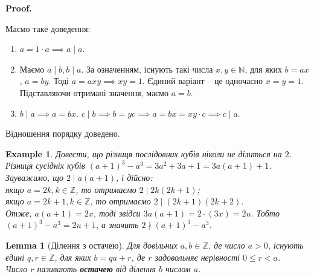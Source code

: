 \documentclass[a4paper, 14pt]{extarticle}
\makeatletter
\theoremstyle{theoremdd}
\theoremstyle{theoremdd}
\theoremstyle{theoremdd}
\theoremstyle{theoremdd}
\newtheorem{example}[theorem]{Example}
\theoremstyle{theoremdd}
\theoremstyle{theoremdd}
\theoremstyle{theoremdd}
\newtheorem{lemma}[theorem]{Lemma}
\theoremstyle{theoremdd}
\def\qed{$\blacksquare$}
\renewenvironment{proof}[1][Proof.\\]{\par
\pushQED{\hfill \qed}%
\normalfont \topsep6\p@\@plus6\p@\relax
\trivlist
\item\relax
{\bfseries
#1\@addpunct{.}}\hspace\labelsep\ignorespaces
}{%
\popQED\endtrivlist\@endpefalse
}
\makeatother
\begin{document}
\begin{proof}
Маємо таке доведення:
\begin{enumerate}[wide=0pt,label={\arabic*)}]
\item $a = 1 \cdot a \implies a \mid a$.
\item Маємо $a \mid b, b \mid a$. За означенням, існують такі числа $x,y \in \mathbb{N}$, для яких $b = ax$, $a = by$. Тоді $a = axy \implies xy = 1$. Єдиний варіант -- це одночасно $x = y = 1$. Підставляючи отримані значення, маємо $a = b$.
\item $b \mid a \implies a = bx$. $c \mid b \implies b = yc \implies a = bx = xy \cdot c \implies c \mid a$.
\end{enumerate}
Відношення порядку доведено.
\end{proof}

\begin{example}
Довести, що різниця послідовних кубів ніколи не ділиться на $2$.\\
Різниця сусідніх кубів $(a+1)^3 - a^3 = 3a^2+3a+1 = 3a(a+1)+1$. Зауважимо, що $2 \mid a(a+1)$, і дійсно:\\
якщо $a = 2k, k \in \mathbb{Z}$, то отримаємо $2 \mid 2k(2k+1)$;\\
якщо $a = 2k+1, k \in \mathbb{Z}$, то отримаємо $2 \mid (2k+1)(2k+2)$.\\
Отже, $a(a+1) = 2x$, тоді звідси $3a(a+1) = 2 \cdot (3x) = 2u$. Тобто $(a+1)^3 - a^3 = 2u+1$, а значить $2 \nmid (a+1)^3-a^3$.
\end{example}

\begin{lemma}[Ділення з остачею]
Для довільних $a,b \in \mathbb{Z}$, де число $a > 0$, існують єдині $q,r \in \mathbb{Z}$, для яких $b = qa + r$, де $r$ задовольняє нерівності $0 \leq r < a$.\\ 
Число $r$ називають \textbf{остачею} від ділення $b$ числом $a$.
\end{lemma}
\end{document}

